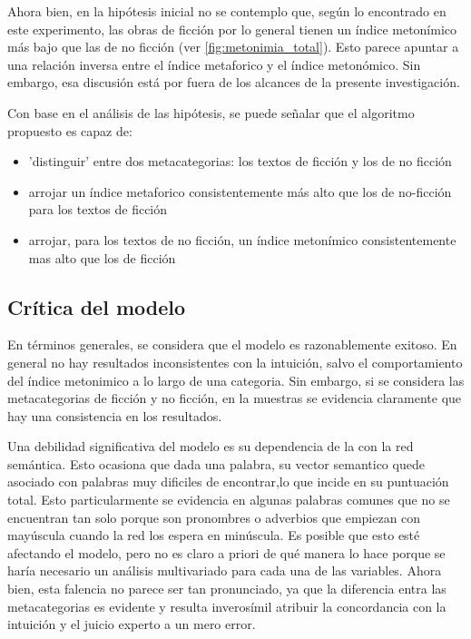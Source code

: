 \documentclass[12pt,letterpaper,twoside]{article}
\begin{document}
Ahora bien, en la hipótesis inicial no se contemplo que, según lo
encontrado en este experimento, las obras de ficción por lo general
tienen un índice metonímico más bajo que las de no ficción (ver \ref{fig:metonimia_total}). Esto
parece apuntar a una relación inversa entre el índice metaforico
y el índice metonómico. Sin embargo, esa discusión está por fuera
de los alcances de la presente investigación.


Con base en el análisis de las hipótesis, se puede señalar que
el algoritmo propuesto es capaz de:

\begin{itemize}
\item 'distinguir' entre dos metacategorias: los textos de ficción y los de no ficción
\item arrojar un índice metaforico consistentemente más alto que los de no-ficción para los textos de ficción
\item arrojar, para los textos de no ficción, un índice metonímico consistentemente mas alto que los de ficción
\end{itemize}

\subsection{Crítica del modelo}
\label{sec:orge69ced1}


En términos generales, se considera que el modelo es razonablemente
exitoso. En general no hay resultados inconsistentes con la intuición,
salvo el comportamiento del índice metonimico a lo largo de una
categoria. Sin embargo, si se considera las metacategorias de ficción
y no ficción, en la muestras se evidencia claramente que hay una
consistencia en los resultados.

Una debilidad significativa del modelo es su dependencia de la con la
red semántica. Esto ocasiona que dada una palabra, su vector semantico
quede asociado con palabras muy dificiles de encontrar,lo que incide
en su puntuación total. Esto particularmente se evidencia en algunas
palabras comunes que no se encuentran tan solo porque son pronombres o
adverbios que empiezan con mayúscula cuando la red los espera en
minúscula. Es posible que esto esté afectando el modelo, pero no es
claro a priori de qué manera lo hace porque se haría necesario un
análisis multivariado para cada una de las variables. Ahora bien, esta
falencia no parece ser tan pronunciado, ya que la diferencia entra las
metacategorias es evidente y resulta inverosímil atribuir la
concordancia con la intuición y el juicio experto a un mero error.
\end{document}
